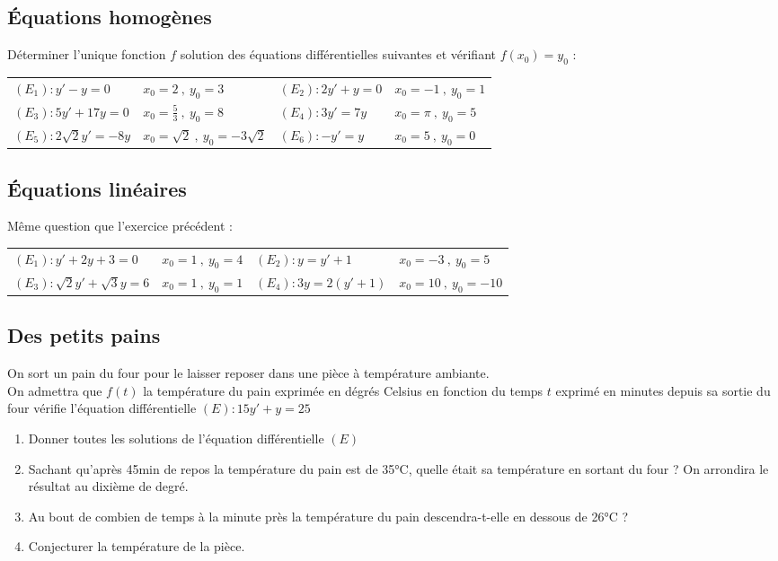 \documentclass[oneside,12pt]{book}          %
\begin{document}
\subsection{Équations homogènes}
  Déterminer l'unique fonction $f$ solution des équations différentielles suivantes et vérifiant $f(x_0)=y_0$ :

\begin{tabular}{p{} p{} | p{} p{}}
    $(E_1):y'-y=0$ & $x_0=2 ~,~ y_0=3$ & $(E_2):2y'+y=0$ & $x_0=-1 ~,~ y_0=1$ \\
    $(E_3):5y'+17y=0$ & $x_0=\frac{5}{3} ~,~ y_0=8$ & $(E_4):3y'=7y$ & $x_0=\pi ~,~ y_0=5$ \\
    $(E_5):2\sqrt{2}y'=-8y$ & $x_0=\sqrt{2} ~,~ y_0=-3\sqrt{2}$ & $(E_6):-y'=y$ & $x_0=5 ~,~ y_0=0$ \\
\end{tabular}



\subsection{Équations linéaires}
  Même question que l'exercice précédent :

\begin{tabular}{p{} p{} | p{} p{}}
    $(E_1):y'+2y+3=0$ & $x_0=1 ~,~ y_0=4$ & $(E_2):y=y'+1$ & $x_0=-3 ~,~ y_0=5$ \\
    $(E_3):\sqrt{2}y'+\sqrt{3}y=6$ & $x_0=1 ~,~ y_0=1$ & $(E_4):3y=2(y'+1)$ & $x_0=10 ~,~ y_0=-10$ \\
\end{tabular}



\subsection{Des petits pains}
On sort un pain du four pour le laisser reposer dans une pièce à température ambiante.\\
On admettra que $f(t)$ la température du pain exprimée en dégrés Celsius en fonction du temps $t$ exprimé en minutes depuis sa sortie du four vérifie l'équation différentielle $(E):15y'+y=25$

\begin{enumerate}
    \item Donner toutes les solutions de l'équation différentielle $(E)$
    \item Sachant qu'après 45min de repos la température du pain est de 35°C, quelle était sa température en sortant du four ? On arrondira le résultat au dixième de degré.
    \item Au bout de combien de temps à la minute près la température du pain descendra-t-elle en dessous de 26°C ?
    \item Conjecturer la température de la pièce.
\end{enumerate}
\end{document}
